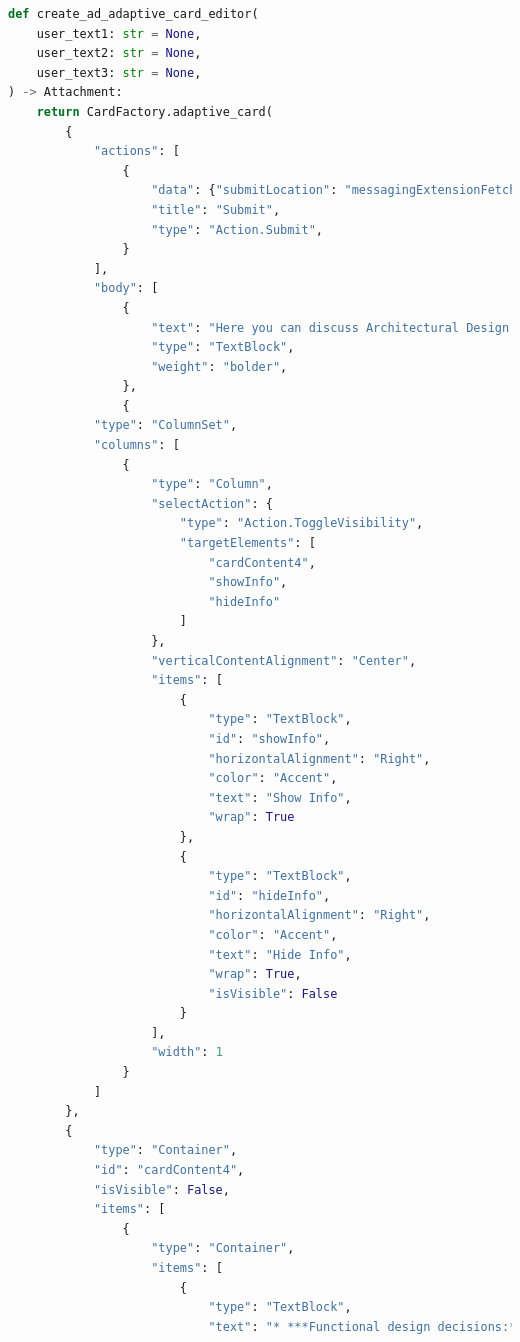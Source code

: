 \begin{lstlisting}[caption={Architectural design card},label={lst:adcard},language=python]
def create_ad_adaptive_card_editor(
    user_text1: str = None,
    user_text2: str = None,
    user_text3: str = None,
) -> Attachment:
    return CardFactory.adaptive_card(
        {
            "actions": [
                {
                    "data": {"submitLocation": "messagingExtensionFetchTask"},
                    "title": "Submit",
                    "type": "Action.Submit",
                }
            ],
            "body": [
                {
                    "text": "Here you can discuss Architectural Design decisions",
                    "type": "TextBlock",
                    "weight": "bolder",
                },
                {
            "type": "ColumnSet",
            "columns": [
                {
                    "type": "Column",
                    "selectAction": {
                        "type": "Action.ToggleVisibility",
                        "targetElements": [
                            "cardContent4",
                            "showInfo",
                            "hideInfo"
                        ]
                    },
                    "verticalContentAlignment": "Center",
                    "items": [
                        {
                            "type": "TextBlock",
                            "id": "showInfo",
                            "horizontalAlignment": "Right",
                            "color": "Accent",
                            "text": "Show Info",
                            "wrap": True
                        },
                        {
                            "type": "TextBlock",
                            "id": "hideInfo",
                            "horizontalAlignment": "Right",
                            "color": "Accent",
                            "text": "Hide Info",
                            "wrap": True,
                            "isVisible": False
                        }
                    ],
                    "width": 1
                }
            ]
        },
        {
            "type": "Container",
            "id": "cardContent4",
            "isVisible": False,
            "items": [
                {
                    "type": "Container",
                    "items": [
                        {
                            "type": "TextBlock",
                            "text": "* ***Functional design decisions:*** Decisions related to functions describe functionality of the system under consideration independant of the solution.",

\end{lstlisting}
